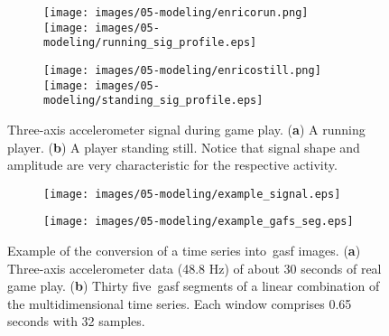 



\begin{figure}[H]
\centering
\begin{subfigure}[H]{\textwidth}
\centering
\texttt{[image: images/05-modeling/enricorun.png]} 
\texttt{[image: images/05-modeling/running\_sig\_profile.eps]} 
\caption{}
\end{subfigure}

\begin{subfigure}[H]{\textwidth}
\centering
\texttt{[image: images/05-modeling/enricostill.png]}
\texttt{[image: images/05-modeling/standing\_sig\_profile.eps]} 
\caption{}
\end{subfigure} \vspace{-6pt}
\caption{Three-axis accelerometer signal during game play. (\textbf{a}) A running player. (\textbf{b}) A player standing still. Notice that signal shape and amplitude are very characteristic for the respective activity.}
\label{figure:acc_signal_shape}
\end{figure} \unskip

\begin{figure}[H]
\centering
\begin{subfigure}[H]{\textwidth}
\centering
\texttt{[image: images/05-modeling/example\_signal.eps]}
\label{figure:accelerometer_signal}
\caption{}
\end{subfigure} \vspace{-6pt}

\begin{subfigure}[H]{\textwidth}
\centering
\texttt{[image: images/05-modeling/example\_gafs\_seg.eps]}
\caption{}
\end{subfigure} \vspace{-6pt}
\caption{Example of the conversion of a time series into~\gls{gasf} images. (\textbf{a}) Three-axis accelerometer data (48.8 Hz) of about 30 seconds of real game play. (\textbf{b}) Thirty five~\gls{gasf} segments of a linear combination of the multidimensional time series. Each window comprises 0.65 seconds with 32 samples.}
\label{figure:acc_signal_gasfs}
\end{figure}


